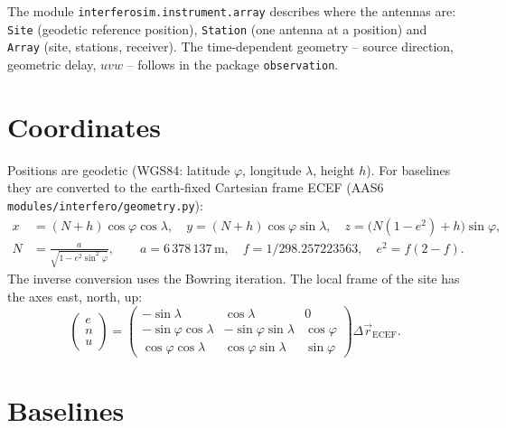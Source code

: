 \label{ch:array}

The module \texttt{interferosim.instrument.array} describes where the
antennas are: \texttt{Site} (geodetic reference position),
\texttt{Station} (one antenna at a position) and \texttt{Array} (site,
stations, receiver). The time-dependent geometry -- source direction,
geometric delay, $uvw$ -- follows in the package \texttt{observation}.

\section{Coordinates}

Positions are geodetic (WGS84: latitude $\varphi$, longitude $\lambda$,
height $h$). For baselines they are converted to the earth-fixed
Cartesian frame ECEF (AAS6 \texttt{modules/interfero/geometry.py}):
\begin{align}
  x &= (N+h)\cos\varphi\cos\lambda, \quad
  y = (N+h)\cos\varphi\sin\lambda, \quad
  z = \bigl(N(1-e^2)+h\bigr)\sin\varphi,\\
  N &= \frac{a}{\sqrt{1-e^2\sin^2\varphi}},\qquad
  a = 6\,378\,137\,\mathrm{m},\quad f = 1/298.257223563,\quad e^2 = f(2-f).
\end{align}
The inverse conversion uses the Bowring iteration. The local frame of
the site has the axes east, north, up:
\begin{equation}
  \begin{pmatrix} e\\ n\\ u \end{pmatrix} =
  \begin{pmatrix}
    -\sin\lambda & \cos\lambda & 0\\
    -\sin\varphi\cos\lambda & -\sin\varphi\sin\lambda & \cos\varphi\\
    \cos\varphi\cos\lambda & \cos\varphi\sin\lambda & \sin\varphi
  \end{pmatrix}
  \Delta\vec r_\mathrm{ECEF}.
\end{equation}

\section{Baselines}


